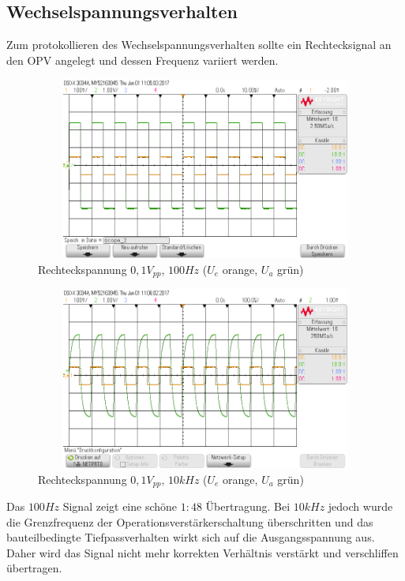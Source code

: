 \subsection{Wechselspannungsverhalten}

Zum protokollieren des Wechselspannungsverhalten sollte ein Rechtecksignal an den OPV angelegt und dessen Frequenz variiert 
werden.\\

\begin{figure}[H]
 \begin{center}
  \includegraphics[height=6cm,width=12cm]{OsziBilder/nichtInvVer_100Hz}
 \end{center}
 \caption{Rechteckspannung $0,1V_{pp}$, $100Hz$ ($U_e$ orange, $U_a$ grün)}
\end{figure}

\begin{figure}[H]
 \begin{center}
  \includegraphics[height=6cm,width=12cm]{OsziBilder/nichtInvVer_10kHz}
 \end{center}
 \caption{Rechteckspannung $0,1V_{pp}$, $10kHz$ ($U_e$ orange, $U_a$ grün)}
\end{figure}
\noindent
Das $100Hz$ Signal zeigt eine schöne $1:48$ Übertragung. Bei $10kHz$ jedoch
wurde die Grenzfrequenz der Operationsverstärkerschaltung überschritten und das bauteilbedingte Tiefpassverhalten wirkt sich 
auf die Ausgangsspannung aus. Daher wird das Signal nicht mehr korrekten Verhältnis verstärkt und verschliffen übertragen.\\

